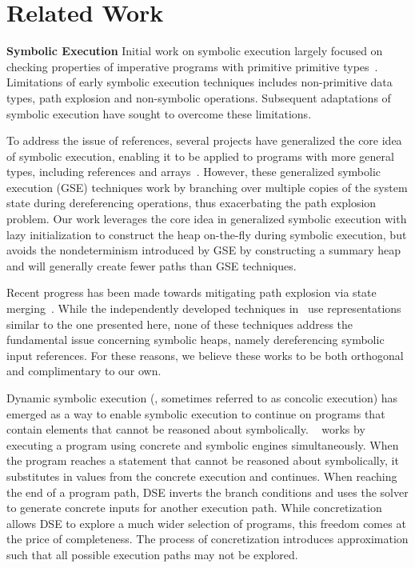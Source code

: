 \section{Related Work}

\noindent\textbf{Symbolic Execution} 
Initial work on symbolic execution largely focused on checking
properties of imperative programs with primitive primitive
types~\cite{Clarke:76,King:76}. Limitations of early symbolic execution techniques includes non-primitive data types, path explosion and non-symbolic operations. Subsequent adaptations of symbolic execution have sought to overcome these limitations.

To address the issue of references, several projects have generalized
the core idea of symbolic execution, enabling it to be applied to
programs with more general types, including references and
arrays~\cite{GSE03,KiasanKunit,Cadar:2008,Rosner:2015}. However, these generalized symbolic execution (GSE) techniques work by branching over multiple copies of the system state during dereferencing operations, thus exacerbating the path explosion problem. Our work leverages the core idea in generalized symbolic execution
with lazy initialization to construct the heap on-the-fly during
symbolic execution, but avoids the nondeterminism introduced by GSE by
constructing a summary heap and will generally create fewer paths than
GSE techniques.

Recent progress has been made towards mitigating path explosion via state merging~\cite{Kuznetsov:2012,Sen:2014,Torlak:2014}. While the independently developed techniques in~\cite{Sen:2014,Torlak:2014} use representations similar to the one presented here, none of these techniques address the fundamental issue concerning symbolic heaps, namely dereferencing symbolic input references. For these reasons, we believe these works to be both orthogonal and complimentary to our own.

Dynamic symbolic execution (\dsetxt{}, sometimes referred to as concolic execution) has emerged as a way to enable symbolic execution to continue on programs that contain elements that cannot be reasoned about symbolically. ~\dsetxt{} works by executing a program using concrete and symbolic engines simultaneously. When the program reaches a statement that cannot be reasoned about symbolically, it substitutes in values from the concrete execution and continues. When reaching the end of a program path, DSE inverts the branch conditions and uses the solver to generate concrete inputs for another execution path. While concretization allows DSE to explore a much wider selection of programs, this freedom comes at the price of completeness. The process of concretization introduces approximation such that all possible execution paths may not be explored.

